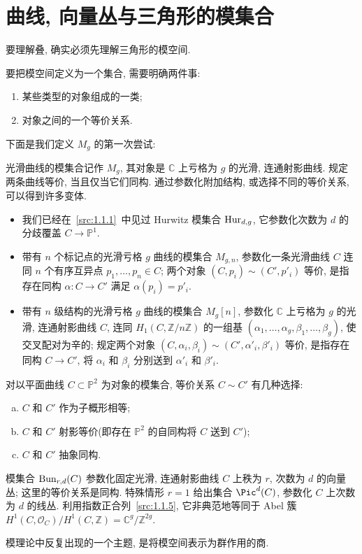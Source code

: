 \section{曲线, 向量丛与三角形的模集合}\label{src:1.2}
\begin{epigraph}
要理解叠, 确实必须先理解三角形的模空间.
\end{epigraph}
要把模空间定义为一个集合, 需要明确两件事: 
\begin{enumerate}[(1)]
\item 某些类型的对象组成的一类; 
\item 对象之间的一个等价关系.
\end{enumerate}
下面是我们定义 $M_g$ 的第一次尝试: 
\begin{example}[光滑曲线的模集合]\label{src:1.2.1}
光滑曲线的模集合记作 $M_g$, 其对象是 $\mathbb C$ 上亏格为 $g$ 的光滑, 连通射影曲线. 规定两条曲线等价, 当且仅当它们同构. 通过参数化附加结构, 或选择不同的等价关系, 可以得到许多变体.
\begin{itemize}
\item 我们已经在~\eqref{src:1.1.1}~中见过 Hurwitz 模集合 $\operatorname{Hur}_{d,g}$, 它参数化次数为 $d$ 的分歧覆盖 $C\to\mathbb P^1$.
\item 带有 $n$ 个标记点的光滑亏格 $g$ 曲线的模集合 $M_{g,n}$, 参数化一条光滑曲线 $C$ 连同 $n$ 个有序互异点 $p_1,\ldots,p_n\in C$; 两个对象 $(C,p_i)\sim(C',p'_i)$ 等价, 是指存在同构 $\alpha:C\to C'$ 满足 $\alpha(p_i)=p'_i$.
\item 带有 $n$ 级结构的光滑亏格 $g$ 曲线的模集合 $M_g[n]$, 参数化 $\mathbb C$ 上亏格为 $g$ 的光滑, 连通射影曲线 $C$, 连同 $H_1(C,\mathbb Z/n\mathbb Z)$ 的一组基 $(\alpha_1,\ldots,\alpha_g,\beta_1,\ldots,\beta_g)$, 使交叉配对为辛的; 规定两个对象 $(C,\alpha_i,\beta_i)\sim(C',\alpha'_i,\beta'_i)$ 等价, 是指存在同构 $C\to C'$, 将 $\alpha_i$ 和 $\beta_i$ 分别送到 $\alpha'_i$ 和 $\beta'_i$.
\end{itemize}
对以平面曲线 $C\subset\mathbb P^2$ 为对象的模集合, 等价关系 $C\sim C'$ 有几种选择: 
\begin{enumerate}[(a)]
\item $C$ 和 $C'$ 作为子概形相等; 
\item $C$ 和 $C'$ 射影等价(即存在 $\mathbb P^2$ 的自同构将 $C$ 送到 $C'$); 
\item $C$ 和 $C'$ 抽象同构.
\end{enumerate}
\end{example}

\begin{example}[曲线上向量丛的模集合]\label{src:1.2.2}
模集合 $\operatorname{Bun}_{r,d}(C)$ 参数化固定光滑, 连通射影曲线 $C$ 上秩为 $r$, 次数为 $d$ 的向量丛; 这里的等价关系是同构. 特殊情形 $r=1$ 给出集合 $\Pic^d(C)$, 参数化 $C$ 上次数为 $d$ 的线丛. 利用指数正合列~\eqref{src:1.1.5}, 它非典范地等同于 Abel 簇 $H^1(C,\mathcal O_C)/H^1(C,\mathbb Z)=\mathbb C^g/\mathbb Z^{2g}$.
\end{example}
模理论中反复出现的一个主题, 是将模空间表示为群作用的商.

